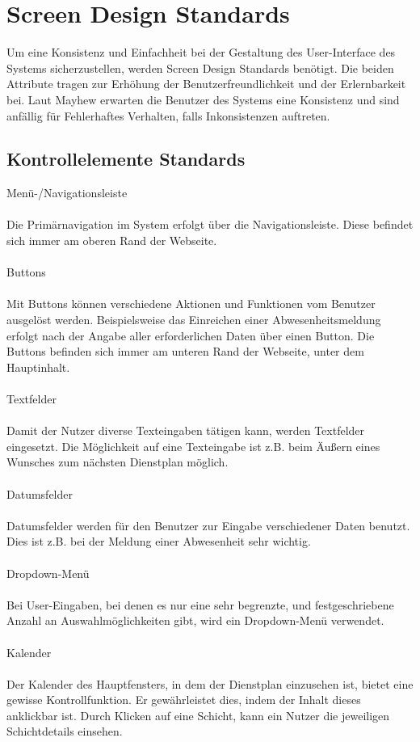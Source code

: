 \documentclass[11pt,
paper=a4,
bibtotocnumbered,	  %
liststotocnumbered,  %
DIV=calc,		  %
tablecaptionabove,	  %
headinclude,
]{article}
\begin{document}
\section{Screen Design Standards}
Um eine Konsistenz und Einfachheit bei der Gestaltung des User-Interface des Systems sicherzustellen, werden Screen Design Standards benötigt. Die beiden Attribute tragen zur Erhöhung der Benutzerfreundlichkeit und der Erlernbarkeit bei. Laut Mayhew erwarten die Benutzer des Systems eine Konsistenz und sind anfällig für Fehlerhaftes Verhalten, falls Inkonsistenzen auftreten.
\subsection{Kontrollelemente Standards}
Menü-/Navigationsleiste\\\\
Die Primärnavigation im System erfolgt über die Navigationsleiste. Diese befindet sich immer am oberen Rand der Webseite.\\\\
Buttons\\\\
Mit Buttons können verschiedene Aktionen und Funktionen vom Benutzer ausgelöst werden. Beispielsweise das Einreichen einer Abwesenheitsmeldung erfolgt nach der Angabe aller erforderlichen Daten über einen Button. Die Buttons befinden sich immer am unteren Rand der Webseite, unter dem Hauptinhalt. \\\\
Textfelder\\\\
Damit der Nutzer diverse Texteingaben tätigen kann, werden Textfelder eingesetzt. Die Möglichkeit auf eine Texteingabe ist z.B. beim Äußern eines Wunsches zum nächsten Dienstplan möglich. \\\\
Datumsfelder\\\\
Datumsfelder werden für den Benutzer zur Eingabe verschiedener Daten benutzt. Dies ist z.B. bei der Meldung einer Abwesenheit sehr wichtig. \\\\
Dropdown-Menü\\\\
Bei User-Eingaben, bei denen es nur eine sehr begrenzte, und festgeschriebene Anzahl an Auswahlmöglichkeiten gibt, wird ein Dropdown-Menü verwendet.\\\\
Kalender\\\\
Der Kalender des Hauptfensters, in dem der Dienstplan einzusehen ist, bietet eine gewisse Kontrollfunktion. Er gewährleistet dies, indem der Inhalt dieses anklickbar ist. Durch Klicken auf eine Schicht, kann ein Nutzer die jeweiligen Schichtdetails einsehen.\\\\
\end{document}
